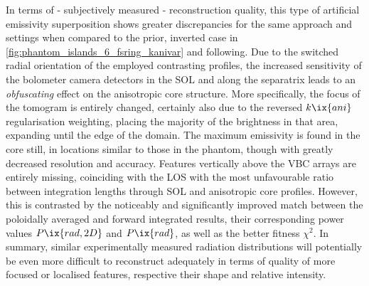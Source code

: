             In terms of - subjectively measured - reconstruction quality, this type of artificial emissivity superposition shows greater discrepancies for the same approach and settings when compared to the prior, inverted case in \cref{fig:phantom_islands_6_fsring_kanivar} and following. Due to the switched radial orientation of the employed contrasting profiles, the increased sensitivity of the bolometer camera detectors in the SOL and along the separatrix leads to an \textit{obfuscating} effect on the anisotropic core structure. More specifically, the focus of the tomogram is entirely changed, certainly also due to the reversed $k\ix{ani}$ regularisation weighting, placing the majority of the brightness in that area, expanding until the edge of the domain. The maximum emissivity is found in the core still, in locations similar to those in the phantom, though with greatly decreased resolution and accuracy. Features vertically above the VBC arrays are entirely missing, coinciding with the LOS with the most unfavourable ratio between integration lengths through SOL and anisotropic core profiles. However, this is contrasted by the noticeably and significantly improved match between the poloidally averaged and forward integrated results, their corresponding power values $P\ix{rad,2D}$ and $P\ix{rad}$, as well as the better fitness $\chi^{2}$. In summary, similar experimentally measured radiation distributions will potentially be even more difficult to reconstruct adequately in terms of quality of more focused or localised features, respective their shape and relative intensity.%
%
